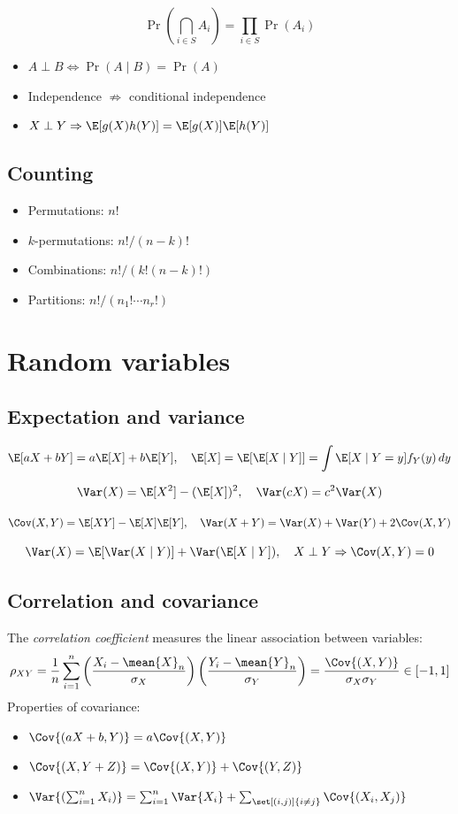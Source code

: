 \documentclass[a4paper]{article}
\begin{document}
\[
\Pr\!\left(\bigcap_{i\in S} A_i\right)=\prod_{i\in S}\Pr(A_i)
\]

\begin{itemize}
\item $A\perp B \iff \Pr(A\mid B)=\Pr(A)$
\item Independence $\not\Rightarrow$ conditional independence
\item $X\perp Y \Rightarrow \E[g(X)h(Y)]=\E[g(X)]\E[h(Y)]$
\end{itemize}

\subsection{Counting}
\begin{itemize}
\item Permutations: $n!$
\item $k$-permutations: $n!/(n-k)!$
\item Combinations: $n!/(k!(n-k)!)$
\item Partitions: $n!/(n_1!\cdots n_r!)$
\end{itemize}

\section{Random variables}

\subsection{Expectation and variance}

\[
\E[aX+bY]=a\E[X]+b\E[Y],\quad
\E[X]=\E[\E[X\mid Y]]=\int \E[X\mid Y=y]f_Y(y)\,dy
\]

\[
\Var(X)=\E[X^2]-(\E[X])^2,\quad
\Var(cX)=c^2\Var(X)
\]

\[
\Cov(X,Y)=\E[XY]-\E[X]\E[Y],\quad
\Var(X+Y)=\Var(X)+\Var(Y)+2\Cov(X,Y)
\]

\[
\Var(X)=\E[\Var(X\mid Y)]+\Var(\E[X\mid Y]),\quad
X\perp Y \Rightarrow \Cov(X,Y)=0
\]
    \subsection{Correlation and covariance}
        The \emph{correlation coefficient} measures the linear association between variables:
        \[
            \rho_{XY} = \frac{1}{n} \sum_{i=1}^{n} \left(\frac{X_i - \mean{X}_n}{\sigma_X}\right) \left(\frac{Y_i - \mean{Y}_n}{\sigma_Y}\right) = \frac{\Cov{(X, Y)}}{\sigma_X \sigma_Y} \in [-1, 1]
        \]
        Properties of covariance:
        \begin{itemize}
            \item $\Cov{(aX + b, Y)} = a \Cov{(X, Y)}$
            \item $\Cov{(X, Y + Z)} = \Cov{(X, Y)} + \Cov{(Y, Z)}$
            \item $\Var{\left(\sum_{i=1}^{n} X_i\right)} = \sum_{i=1}^{n} \Var{X_i} + \sum_{\set[(i, j)]{i \neq j}} \Cov{(X_i, X_j)}$
        \end{itemize}
\end{document}
